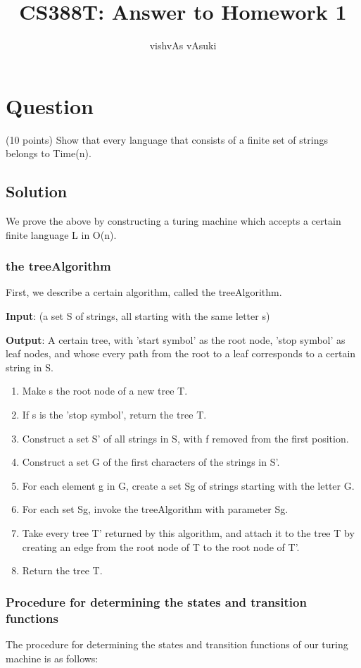 \documentclass[10pt]{article}
\title{CS388T: Answer to Homework 1}
\author{vishvAs vAsuki}
\begin{document}
\maketitle

\section{Question}

(10 points) Show that every language that consists of a finite set of strings belongs to Time(n).

\subsection{Solution}

We prove the above by constructing a turing machine which accepts a certain finite language L in O(n).
\subsubsection*{the treeAlgorithm}
First, we describe a certain algorithm, called the treeAlgorithm.

\textbf{Input}: (a set S of strings, all starting with the same letter s)

\textbf{Output}: A certain tree, with 'start symbol' as the root node, 'stop symbol' as leaf nodes, and whose every path from the root to a leaf corresponds to a certain string in S.

\begin{enumerate}
\item Make s the root node of a new tree T.
\item If s is the 'stop symbol', return the tree T.
\item Construct a set S' of all strings in S, with f removed from the first position.
\item Construct a set G of the first characters of the strings in S'.
\item For each element g in G, create a set Sg of strings starting with the letter G.
\item For each set Sg, invoke the treeAlgorithm with parameter Sg.
\item Take every tree T' returned by this algorithm, and attach it to the tree T by creating an edge from the root node of T to the root node of T'.
\item Return the tree T.
\end{enumerate}

\subsubsection*{Procedure for determining the states and transition functions}
The procedure for determining the states and transition functions of our turing machine is as follows: 
\end{document}
